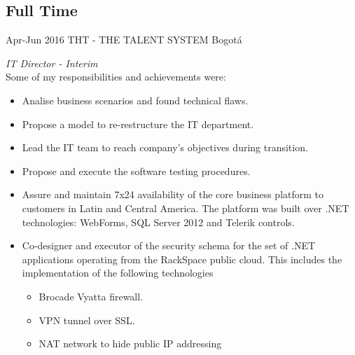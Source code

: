 \documentclass[]{friggeri-cv} %
\begin{document}
\begin{entrylist}
\begin{entrylist}
\end{entrylist}

\subsection{Full Time}

\begin{entrylist}

\entry
{Apr-Jun 2016}
{THT - THE TALENT SYSTEM}
{Bogotá}
{\emph{IT Director - Interim} \\
Some of my responsibilities and achievements were:
\begin{itemize}
\item Analise business scenarios and found technical flaws.
\item Propose a model to re-restructure the IT department.
\item Lead the IT team to reach company's objectives during transition.
\item Propose and execute the software testing procedures.
\item Assure and maintain 7x24 availability of the core business platform to customers in Latin and Central America. The platform was built over .NET technologies: WebForms, SQL Server 2012 and Telerik controls.
\item Co-designer and executor of the security schema for the set of .NET applications operating from the RackSpace public cloud. This includes the implementation of the following technologies
\begin{itemize}
\item Brocade Vyatta firewall.
\item VPN tunnel over SSL.
\item NAT network to hide public IP addressing
\end{itemize}
\end{itemize}

}
\\


\end{entrylist}
\end{entrylist}
\end{document}
